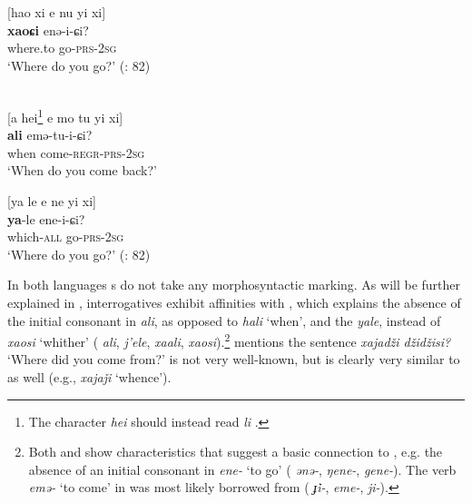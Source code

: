     \ex
     [hao xi e nu yi xi]\\
    \gll \textbf{{xaoɕi}} enə-i-ɕi?\\
    where.to  go-\textsc{prs-2sg}\\
    \glt ‘Where do you go?’ (\citealt{NDSSLD1958}: 82)
    \z
    \z

\ea%
    \label{ex:tungu:47}
    \\
    \ea
     [a hei\footnote{The character \textit{hei}  should instead read \textit{li} .} e mo tu yi xi]\\
    \gll \textbf{{ali}} emə-tu-i-ɕi?\\
    when  come-\textsc{regr-prs-2sg}\\
    \glt ‘When do you come back?’
    
    \ex
     [ya le e ne yi xi]\\
    \gll \textbf{{ya}}-le    ene-i-ɕi?\\
    which-\textsc{all}  go-\textsc{prs-2sg}\\
    \glt ‘Where do you go?’ (\citealt{NDSSLD1958}: 82)
    \z
    \z

In both languages s do not take any morphosyntactic marking. As will be further explained in ,  interrogatives exhibit affinities with , which explains the absence of the initial consonant in \textit{ali}, as opposed to  \textit{hali} ‘when’, and the  \textit{yale}, instead of  \textit{xaosi} ‘whither’ ( \textit{ali}, \textit{j’ele},  \textit{xaali}, \textit{xaosi}).\footnote{Both  and  show characteristics that suggest a basic connection to , e.g. the absence of an initial consonant in \textit{ene-} ‘to go’ ( \textit{ənə-},  \textit{ŋene-},  \textit{gene-}). The verb \textit{emə-} ‘to come’ in  was most likely borrowed from  ( \textit{\.{ɟ}i-},  \textit{eme-},  \textit{ji-}).} \citet[241]{Schmidt1928b} mentions the  sentence \textit{xajadži džidžisi?} ‘Where did you come from?’  is not very well-known, but is clearly very similar to  as well (e.g.,  \textit{xajaǰi} ‘whence’).

